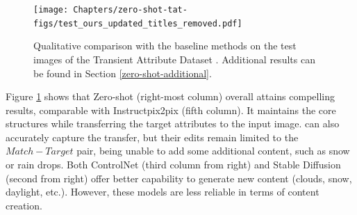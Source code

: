  \begin{figure}[ht]
  \texttt{[image: Chapters/zero-shot-tat-figs/test\_ours\_updated\_titles\_removed.pdf]}
  \caption{Qualitative comparison with the baseline methods on the test images of the Transient Attribute Dataset \cite{laffont2014transient}. Additional results can be found in Section \ref{zero-shot-additional}.}
  \label{fig:zero-shot-comparison}
\end{figure}

Figure \ref{fig:zero-shot-comparison} shows that Zero-shot (right-most column) overall attains compelling results, comparable with Instructpix2pix (fifth column). It maintains the core structures while transferring the target attributes to the input image. \citeauthor{laffont2014transient} \cite{laffont2014transient} can also accurately capture the transfer, but their edits remain limited to the $Match - Target$ pair, being unable to add some additional content, such as snow or rain drops. Both ControlNet (third column from right) and Stable Diffusion (second from right) offer better capability to generate new content (clouds, snow, daylight, etc.). However, these models are less reliable in terms of content creation. 

